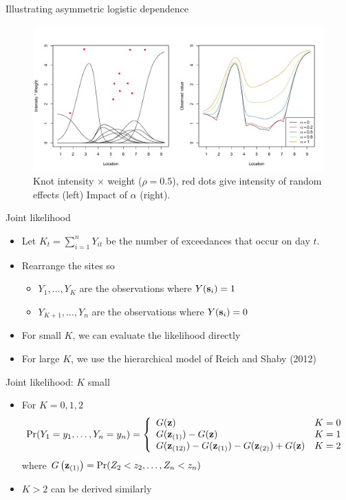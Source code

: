 \documentclass{beamer}
\begin{document}
\begin{frame}{Illustrating asymmetric logistic dependence}
  \centering
  \begin{figure}
    \includegraphics[width=\linewidth, trim=0 0.5in 0 0]{./plots/max-stable.pdf}
    \caption{Knot intensity $\times$ weight ($\rho = 0.5$), red dots give intensity of random effects (left) Impact of $\alpha$ (right).}
   \end{figure}
\end{frame}

\begin{frame}{Joint likelihood}
  \begin{itemize} \setlength{\itemsep}{1em}
    \item Let $K_t = \sum_{i = 1}^n Y_{it}$ be the number of exceedances that occur on day $t$.
    \item Rearrange the sites so
    \begin{itemize}
      \item $Y_1, \ldots, Y_K$ are the observations where $Y(\mbox{\bf s}_i) = 1$
      \item $Y_{K+1}, \ldots, Y_n$ are the observations where $Y(\mbox{\bf s}_i) = 0$
    \end{itemize}
    \item For small $K$, we can evaluate the likelihood directly
    \item For large $K$, we use the hierarchical model of Reich and Shaby (2012)
  \end{itemize}
\end{frame}

\begin{frame}{Joint likelihood: $K$ small}
  \begin{itemize} \setlength{\itemsep}{1em}
    \item For $K = 0, 1, 2$
    {\scriptsize
    \begin{align*}
      \Pr(Y_1 = y_1, \ldots, Y_n = y_n) = \left\{ \begin{array}{ll}
        G(\mbox{\bf z})  & K = 0\\
        G(\mbox{\bf z}_{(1)}) - G(\mbox{\bf z}) & K = 1\\
        G(\mbox{\bf z}_{(12)}) - G(\mbox{\bf z}_{(1)}) - G(\mbox{\bf z}_{(2)}) + G(\mbox{\bf z}) & K =2
      \end{array}\right.
    \end{align*}
    }
    where $G\left(\mbox{\bf z}_{(1)}\right) = \Pr(Z_2 < z_2, \ldots, Z_n < z_n)$
    \item $K > 2$ can be derived similarly
  \end{itemize}
\end{frame}
\end{document}
